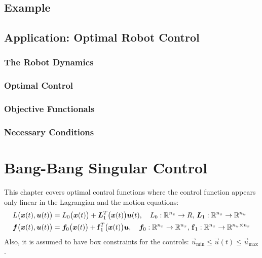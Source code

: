 		\subsection{Example} %

		\subsection{Application: Optimal Robot Control} %

			\subsubsection{The Robot Dynamics} %

			\subsubsection{Optimal Control} %

			\subsubsection{Objective Functionals} %

			\subsubsection{Necessary Conditions} %

	\section{Bang-Bang Singular Control}
		This chapter covers optimal control functions where the control function appears only linear in the Lagrangian and the motion equations:
		\begin{align*}
			L\big(\bm{x}(t), \bm{u}(t)\big)       & = L_0\big(\bm{x}(t)\big) + \bm{L}_1^T\big(\bm{x}(t)\big) \bm{u}(t),\quad L_0 : \mathbb{R}^{n_x} \to R,\, \bm{L}_1 : \mathbb{R}^{n_x} \to \mathbb{R}^{n_u}                            \\
			\bm{f}\big(\bm{x}(t), \bm{u}(t)\big) & = \bm{f}_0\big(\bm{x}(t)\big) + \bm{\mathrm{f}}_1^T\big(\bm{x}(t)\big) \bm{u},\quad \bm{f}_0 : \mathbb{R}^{n_x} \to \mathbb{R}^{n_x},\, \bm{\mathrm{f}}_1 : \mathbb{R}^{n_x} \to \mathbb{R}^{n_u \times n_x}
		\end{align*}
		Also, it is assumed to have box constraints for the controls: \( \vec{u}_\mathrm{min} \leq \vec{u}(t) \leq \vec{u}_\mathrm{max} \).

